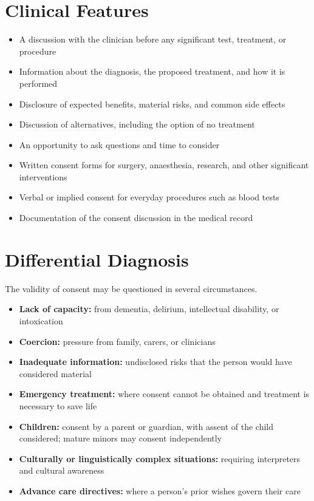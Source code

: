 \section*{Clinical Features}
\begin{itemize}
    \item A discussion with the clinician before any significant test, treatment, or procedure
    \item Information about the diagnosis, the proposed treatment, and how it is performed
    \item Disclosure of expected benefits, material risks, and common side effects
    \item Discussion of alternatives, including the option of no treatment
    \item An opportunity to ask questions and time to consider
    \item Written consent forms for surgery, anaesthesia, research, and other significant interventions
    \item Verbal or implied consent for everyday procedures such as blood tests
    \item Documentation of the consent discussion in the medical record
\end{itemize}

\section*{Differential Diagnosis}
The validity of consent may be questioned in several circumstances.
\begin{itemize}
    \item \textbf{Lack of capacity:} from dementia, delirium, intellectual disability, or intoxication
    \item \textbf{Coercion:} pressure from family, carers, or clinicians
    \item \textbf{Inadequate information:} undisclosed risks that the person would have considered material
    \item \textbf{Emergency treatment:} where consent cannot be obtained and treatment is necessary to save life
    \item \textbf{Children:} consent by a parent or guardian, with assent of the child considered; mature minors may consent independently
    \item \textbf{Culturally or linguistically complex situations:} requiring interpreters and cultural awareness
    \item \textbf{Advance care directives:} where a person's prior wishes govern their care
\end{itemize}

